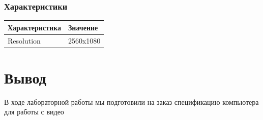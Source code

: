 \documentclass[a4paper]{article}
\begin{document}
\subsubsection{Характеристики}
\begin{table}[H]
\centering
\begin{tabular}{|l|l|}
\hline
Характеристика & Значение \\
\hline
Resolution & 2560x1080 \\
\hline
\end{tabular}
\end{table}


\section{Вывод}
В ходе лабораторной работы мы подготовили на заказ спецификацию компьютера для работы с видео
\end{document}
